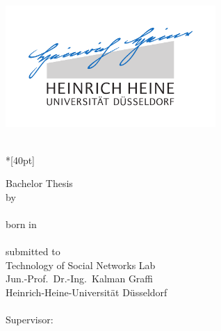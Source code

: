 
\begin{titlepage}
  \centering
  \includegraphics[width=8cm]{fig/unilogo}

  \vfill
  \Huge
  \thesistitle{}\\*[40pt]
  \normalsize

% 
    
  \vfill
  \Large
  Bachelor Thesis\\[0.25em]
  \large
  by\\[5mm]
  \huge
  \thesisauthor{}\\

  \vspace{5mm}
  \large
  born in\\ \thesisauthorbirthplace{}\\[1cm]
  submitted to\\[5mm]
  Technology of Social Networks Lab\\
  Jun.-Prof.\ Dr.-Ing.\ Kalman Graffi\\ 
  Heinrich-Heine-Universit{\"a}t D{\"u}sseldorf\\[0.5cm]
  \thesissubmissionmonth{} \thesissubmissionyear{}\\[0.5cm]
  Supervisor:\\
  \thesissupervisor{}  
    
    
    
\end{titlepage}


